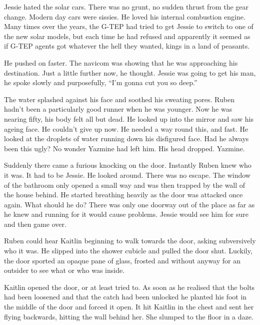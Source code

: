 Jessie hated the solar cars.  There was no grunt, no sudden thrust from the gear change.  Modern day cars were sissies.  He loved his internal combustion engine.  Many times over the years, the G-TEP had tried to get Jessie to switch to one of the new solar models, but each time he had refused and apparently it seemed as if G-TEP agents got whatever the hell they wanted, kings in a land of peasants.

He pushed on faster.  The navicom was showing that he was approaching his destination.  Just a little further now, he thought.  Jessie was going to get his man, he spoke slowly and purposefully, ``I'm gonna cut you so deep.''



\thoughtbreak



The water splashed against his face and soothed his sweating pores.  Ruben hadn't been a particularly good runner when he was younger.  Now he was nearing fifty, his body felt all but dead.  He looked up into the mirror and saw his ageing face.  He couldn't give up now.  He needed a way round this, and fast.  He looked at the droplets of water running down his disfigured face.  Had he always been this ugly?  No wonder Yazmine had left him.  His head dropped.  Yazmine.

Suddenly there came a furious knocking on the door.  Instantly Ruben knew who it was.  It had to be Jessie.  He looked around.  There was no escape.  The window of the bathroom only opened a small way and was then trapped by the wall of the house behind.  He started breathing heavily as the door was attacked once again.  What should he do?  There was only one doorway out of the place as far as he knew and running for it would cause problems.  Jessie would see him for sure and then game over.

Ruben could hear Kaitlin beginning to walk towards the door, asking subversively who it was.  He slipped into the shower cubicle and pulled the door shut.  Luckily, the door sported an opaque pane of glass, frosted and without anyway for an outsider to see what or who was inside.  

Kaitlin opened the door, or at least tried to.  As soon as he realised that the bolts had been loosened and that the catch had been unlocked he planted his foot in the middle of the door and forced it open.  It hit Kaitlin in the chest and sent her flying backwards, hitting the wall behind her.  She slumped to the floor in a daze.

